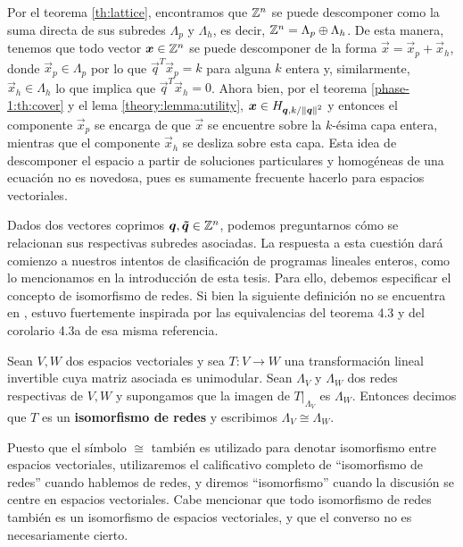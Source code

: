 Por el teorema \ref{th:lattice}, encontramos que $\mathbb{Z}^n$ se puede descomponer como la suma directa de
sus subredes $\Lambda_p$ y $\Lambda_h$, es decir, $\mathbb{Z}^n = \Lambda_p \oplus \Lambda_h$. De esta
manera, tenemos que todo vector $\boldsymbol{x} \in \mathbb{Z}^n$ se puede descomponer de la forma $\vec{x} =
\vec{x}_p + \vec{x}_h$, donde $\vec{x}_p \in \Lambda_p$ por lo que $\vec{q}^T\vec{x}_p = k$ para
alguna $k$ entera y, similarmente, $\vec{x}_h \in \Lambda_h$ lo que implica que $\vec{q}^T\vec{x}_h
= 0$. Ahora bien, por el teorema \ref{phase-1:th:cover} y el lema \ref{theory:lemma:utility},
$\boldsymbol{x} \in H_{\boldsymbol{q}, k/\left\lVert \boldsymbol{q} \right\rVert^{2}}$ y entonces el componente $\vec{x}_p$ se encarga de que $\vec{x}$ se
encuentre sobre la $k$-ésima capa entera, mientras que el componente $\vec{x}_h$ se desliza sobre
esta capa. Esta idea de descomponer el espacio a partir de soluciones particulares y homogéneas de
una ecuación no es novedosa, pues es sumamente frecuente hacerlo para espacios vectoriales.

Dados dos vectores coprimos $\boldsymbol{q}, \boldsymbol{\tilde{q}} \in \mathbb{Z}^n$, podemos preguntarnos cómo se relacionan
sus respectivas subredes asociadas. La respuesta a esta cuestión dará comienzo a nuestros intentos
de clasificación de programas lineales enteros, como lo mencionamos en la introducción de esta
tesis. Para ello, debemos especificar el concepto de isomorfismo de redes. Si bien la siguiente
definición no se encuentra en \cite{alex}, estuvo fuertemente inspirada por las equivalencias del
teorema 4.3 y del corolario 4.3a de esa misma referencia.

\begin{definition}
	\label{def:iso}
	Sean $V, W$ dos espacios vectoriales y sea $T\colon V \to W$ una transformación lineal
	invertible cuya matriz asociada es unimodular. Sean $\Lambda_V$ y $\Lambda_W$ dos redes
	respectivas de $V, W$ y supongamos que la imagen de $T\big|_{\Lambda_V}$ es $\Lambda_W$. Entonces
	decimos que $T$ es un \textbf{isomorfismo de redes} y escribimos $\Lambda_V \cong \Lambda_W$.
\end{definition}

Puesto que el símbolo $\cong$ también es utilizado para denotar isomorfismo entre espacios
vectoriales, utilizaremos el calificativo completo de ``isomorfismo de redes'' cuando hablemos de
redes, y diremos ``isomorfismo'' cuando la discusión se centre en espacios vectoriales. Cabe
mencionar que todo isomorfismo de redes también es un isomorfismo de espacios vectoriales, y que el
converso no es necesariamente cierto.

